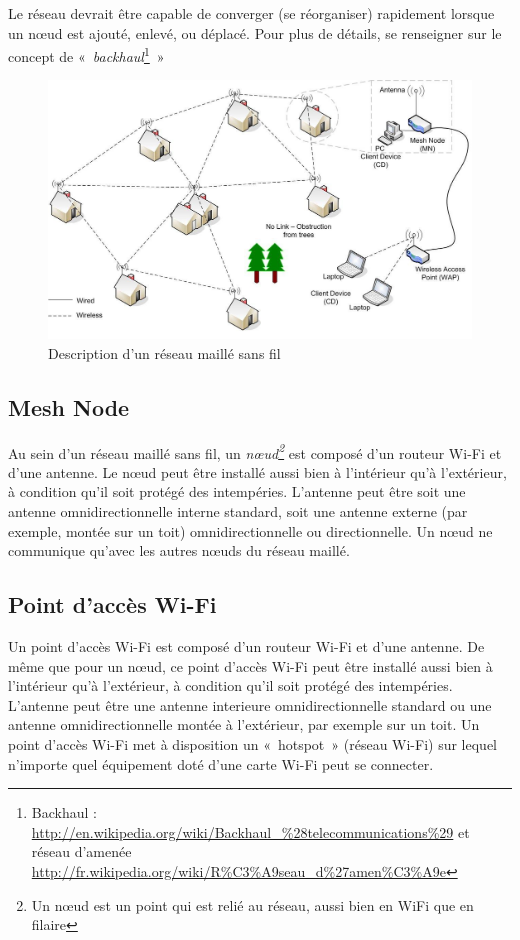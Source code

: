 \documentclass[a4paper,french,11pt,twoside]{article}
\begin{document}
Le réseau devrait être capable de converger (se réorganiser) rapidement lorsque un nœud est ajouté, enlevé, ou déplacé. Pour plus de détails, se renseigner sur le concept de «~\textit{backhaul}\footnote{Backhaul : \url{http://en.wikipedia.org/wiki/Backhaul\_\%28telecommunications\%29} et réseau d'amenée \url{http://fr.wikipedia.org/wiki/R\%C3\%A9seau_d\%27amen\%C3\%A9e}}~»

\begin{figure}[!h]
\center
\includegraphics[scale=0.29]{figure1.jpeg}
\caption{Description d'un réseau maillé sans fil}
\label{figure1} %
\end{figure}

\subsection{Mesh Node}

Au sein d'un réseau maillé sans fil, un \emph{nœud\footnote{Un nœud est un point qui est relié au réseau, aussi bien en WiFi que en filaire}} est composé d'un routeur Wi-Fi et d'une antenne. Le nœud peut être installé aussi bien à l'intérieur qu'à l'extérieur, à condition qu'il soit protégé des intempéries. L'antenne peut être soit une antenne omnidirectionnelle interne standard, soit une antenne externe (par exemple, montée sur un toit) omnidirectionnelle ou directionnelle. Un nœud ne communique qu'avec les autres nœuds du réseau maillé.

\subsection{Point d'accès Wi-Fi}

Un point d'accès Wi-Fi est composé d'un routeur Wi-Fi et d'une antenne. De même que pour un nœud, ce point d'accès Wi-Fi peut être installé aussi bien à l'intérieur qu'à l'extérieur, à condition qu'il soit protégé des intempéries. L'antenne peut être une antenne interieure omnidirectionnelle standard ou une antenne omnidirectionnelle montée à l'extérieur, par exemple sur un toit. Un point d'accès Wi-Fi met à disposition un «~hotspot~» (réseau Wi-Fi) sur lequel n'importe quel équipement doté d'une carte Wi-Fi peut se connecter.
\end{document}
